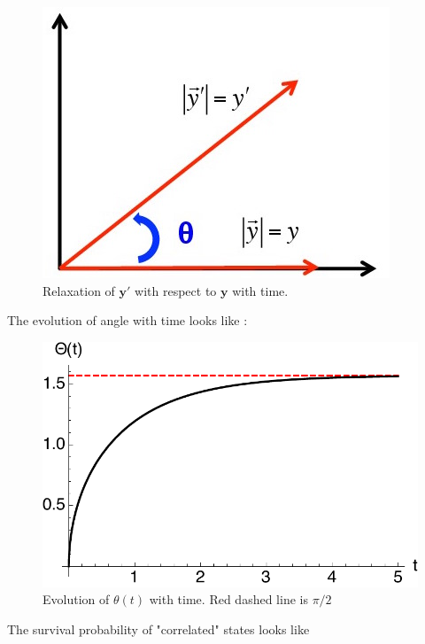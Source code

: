 \documentclass[jcp,groupaddress]{revtex4-1}
\begin{document}
\begin{figure}[H]
\begin{center}
 \includegraphics[scale=0.5]{plots/1D_Relaxation.jpg}
\caption{Relaxation of $\mathbf{y}'$ with respect to $\mathbf{y}$ with time.}
\end{center}
\end{figure}
The evolution of angle with time looks like :
\begin{figure}[H]
\begin{center}
 \includegraphics[scale=0.7]{plots/AngleEvolution.pdf}
\caption{Evolution of $\theta(t)$ with time. Red dashed line is $\pi/2$}
\end{center}
\end{figure}
The survival probability of "correlated" states looks like
\end{document}
